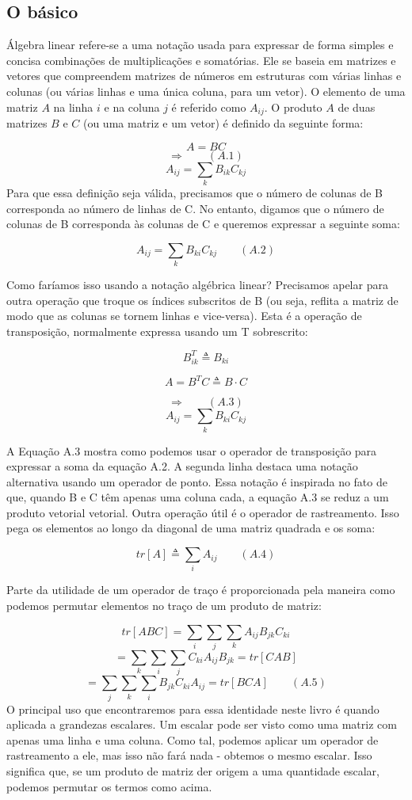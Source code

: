 \documentclass[
  12pt,
]{book}
\begin{document}
\hypertarget{o-buxe1sico}{%
\subsection{O básico}\label{o-buxe1sico}}

Álgebra linear refere-se a uma notação usada para expressar de forma simples e concisa combinações de multiplicações e somatórias. Ele se baseia em matrizes e vetores que compreendem matrizes de números em estruturas com várias linhas e colunas (ou várias linhas e uma única coluna, para um vetor). O elemento de uma matriz \(A\) na linha \(i\) e na coluna \(j\) é referido como \(A_{ij}\). O produto \(A\) de duas matrizes \(B\) e \(C\) (ou uma matriz e um vetor) é definido da seguinte forma:

\[ A = BC \]
\[\Longrightarrow \qquad (A.1)\]
\[ A_{ij} = \sum_k B_{ik} C_{kj} \]
Para que essa definição seja válida, precisamos que o número de colunas de B corresponda ao número de linhas de C. No entanto, digamos que o número de colunas de B corresponda às colunas de C e queremos expressar a seguinte soma:

\[ A_{ij} = \sum_k B_{ki} C_{kj} \qquad (A.2) \]

Como faríamos isso usando a notação algébrica linear? Precisamos apelar para outra operação que troque os índices subscritos de B (ou seja, reflita a matriz de modo que as colunas se tornem linhas e vice-versa). Esta é a operação de transposição, normalmente expressa usando um T sobrescrito:

\[B_{ik}^T \triangleq B_{ki}\]

\[A=B^TC \triangleq B \cdot C\]

\[ \Longrightarrow \qquad (A.3)\]
\[A_{ij} = \sum_k B_{ki}C_{kj}\]

A Equação A.3 mostra como podemos usar o operador de transposição para expressar a soma da equação A.2. A segunda linha destaca uma notação alternativa usando um operador de ponto. Essa notação é inspirada no fato de que, quando B e C têm apenas uma coluna cada, a equação A.3 se reduz a um produto vetorial vetorial.
Outra operação útil é o operador de rastreamento. Isso pega os elementos ao longo da diagonal de uma matriz quadrada e os soma:

\[ tr[A] \triangleq \sum_i A_{ij} \qquad (A.4)\]

Parte da utilidade de um operador de traço é proporcionada pela maneira como podemos permutar elementos no traço de um produto de matriz:

\[ tr[ABC] = \sum_i \sum_j \sum_k A_{ij} B_{jk} C_{ki}\]
\[ = \sum_k \sum_i \sum_j C_{ki} A_{ij} B_{jk} = tr[CAB] \]
\[ = \sum_j \sum_k \sum_i B_{jk} C_{ki} A_{ij} = tr[BCA] \qquad (A.5) \]
O principal uso que encontraremos para essa identidade neste livro é quando aplicada a grandezas escalares. Um escalar pode ser visto como uma matriz com apenas uma linha e uma coluna. Como tal, podemos aplicar um operador de rastreamento a ele, mas isso não fará nada - obtemos o mesmo escalar. Isso significa que, se um produto de matriz der origem a uma quantidade escalar, podemos permutar os termos como acima.
\end{document}
